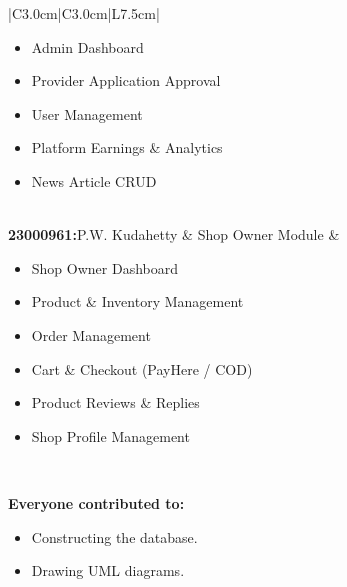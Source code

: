 \documentclass[12pt,a4paper]{article}
\begin{document}
\begin{center}
\begin{tabular}{|C{3.0cm}|C{3.0cm}|L{7.5cm}|}
  \begin{itemize}[leftmargin=1em, itemsep=1pt, topsep=2pt, parsep=0pt]
    \item Admin Dashboard
    \item Provider Application Approval
    \item User Management
    \item Platform Earnings \& Analytics
    \item News Article CRUD
  \end{itemize}\vspace{2pt}
\\ \hline
\textbf{23000961:}\newline P.W. Kudahetty
& Shop Owner Module
& \vspace{2pt}
  \begin{itemize}[leftmargin=1em, itemsep=1pt, topsep=2pt, parsep=0pt]
    \item Shop Owner Dashboard
    \item Product \& Inventory Management
    \item Order Management
    \item Cart \& Checkout (PayHere / COD)
    \item Product Reviews \& Replies
    \item Shop Profile Management
  \end{itemize}\vspace{2pt}
\\ \hline
\end{tabular}
\end{center}

\vspace{0.5cm}
\begin{center}
\textbf{Everyone contributed to:}
\end{center}
\begin{itemize}[leftmargin=4cm, itemsep=2pt]
  \item Constructing the database.
  \item Drawing UML diagrams.
\end{itemize}

\newpage
\end{document}
